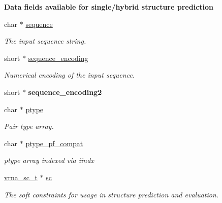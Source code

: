 \begin{Indent}{\bf Data fields available for single/hybrid structure prediction}\par
\begin{DoxyCompactItemize}
\item 
char $\ast$ \hyperlink{group__fold__compound_a87f6abcda89cfb7a486c97e1f5371525}{sequence}
\begin{DoxyCompactList}\small\item\em The input sequence string. \end{DoxyCompactList}\item 
short $\ast$ \hyperlink{group__fold__compound_a9934bdb695d35a3544285cbcc19f9763}{sequence\+\_\+encoding}
\begin{DoxyCompactList}\small\item\em Numerical encoding of the input sequence. \end{DoxyCompactList}\item 
\hypertarget{group__fold__compound_aaf9064092f674882e78665e1646ffdbf}{}short $\ast$ {\bfseries sequence\+\_\+encoding2}\label{group__fold__compound_aaf9064092f674882e78665e1646ffdbf}

\item 
char $\ast$ \hyperlink{group__fold__compound_a3fbea559f1d1976b2d67c215cdeee0b2}{ptype}
\begin{DoxyCompactList}\small\item\em Pair type array. \end{DoxyCompactList}\item 
char $\ast$ \hyperlink{group__fold__compound_a7fe1235ce3d41287695f1ae1e283e8fc}{ptype\+\_\+pf\+\_\+compat}
\begin{DoxyCompactList}\small\item\em ptype array indexed via iindx \end{DoxyCompactList}\item 
\hyperlink{group__soft__constraints_ga75401ce219ef8dbcceb672db82d434c6}{vrna\+\_\+sc\+\_\+t} $\ast$ \hyperlink{group__fold__compound_ac7089e90460ad3990a308808c8044c9f}{sc}
\begin{DoxyCompactList}\small\item\em The soft constraints for usage in structure prediction and evaluation. \end{DoxyCompactList}\end{DoxyCompactItemize}
\end{Indent}
